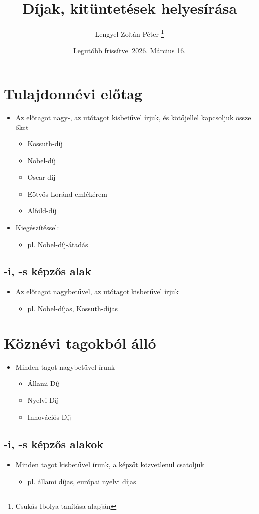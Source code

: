 \documentclass{article}
\title{Díjak, kitüntetések helyesírása}
\author{Lengyel Zoltán Péter \thanks{Csukás Ibolya tanítása alapján}}
\date{Legutóbb frissítve: 2026. Március 16.}
\begin{document}
\maketitle

\tableofcontents

\newpage

\section{Tulajdonnévi előtag}
\begin{itemize}
    \item Az előtagot nagy-, az utótagot kisbetűvel írjuk, és kötőjellel kapcsoljuk össze őket
    \begin{itemize}
        \item Kossuth-díj
        \item Nobel-díj
        \item Oscar-díj
        \item Eötvös Loránd-emlékérem
        \item Alföld-díj
    \end{itemize}

    \item Kiegészítéssel: 
    \begin{itemize}
        \item pl. Nobel-díj-átadás
    \end{itemize}
\end{itemize}

\subsection{-i, -s képzős alak}
\begin{itemize}
    \item Az előtagot nagybetűvel, az utótagot kisbetűvel írjuk \begin{itemize}
        \item pl. Nobel-díjas, Kossuth-díjas
    \end{itemize}
\end{itemize}

\section{Köznévi tagokból álló}
\begin{itemize}
    \item Minden tagot nagybetűvel írunk
    \begin{itemize}
        \item Állami Díj
        \item Nyelvi Díj
        \item Innovációs Díj
    \end{itemize}
\end{itemize}
    \subsection{-i, -s képzős alakok}
    \begin{itemize}
        \item Minden tagot kisbetűvel írunk, a képzőt közvetlenül csatoljuk
        \begin{itemize}
            \item pl. állami díjas, európai nyelvi díjas
        \end{itemize}
    \end{itemize}
\end{document}
